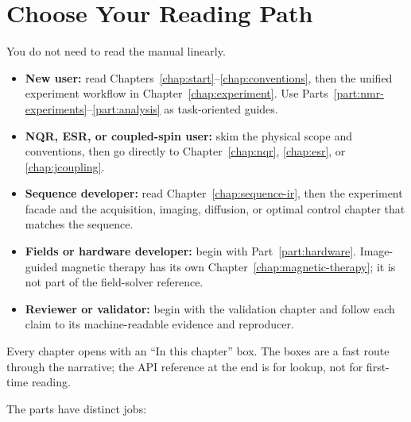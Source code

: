 \documentclass[11pt,oneside]{report}
\begin{document}
\section{Choose Your Reading Path}

You do not need to read the manual linearly.

\begin{itemize}
  \item \textbf{New user:} read Chapters~\ref{chap:start}--\ref{chap:conventions},
  then the unified experiment workflow in Chapter~\ref{chap:experiment}. Use
  Parts~\ref{part:nmr-experiments}--\ref{part:analysis} as task-oriented guides.
  \item \textbf{NQR, ESR, or coupled-spin user:} skim the physical scope and
  conventions, then go directly to Chapter~\ref{chap:nqr}, \ref{chap:esr}, or
  \ref{chap:jcoupling}.
  \item \textbf{Sequence developer:} read Chapter~\ref{chap:sequence-ir}, then
  the experiment facade and the acquisition, imaging, diffusion, or optimal
  control chapter that matches the sequence.
  \item \textbf{Fields or hardware developer:} begin with
  Part~\ref{part:hardware}. Image-guided magnetic therapy has its own
  Chapter~\ref{chap:magnetic-therapy}; it is not part of the field-solver
  reference.
  \item \textbf{Reviewer or validator:} begin with the validation chapter and
  follow each claim to its machine-readable evidence and reproducer.
\end{itemize}

Every chapter opens with an ``In this chapter'' box. The boxes are a fast route
through the narrative; the API reference at the end is for lookup, not for
first-time reading.

The parts have distinct jobs:
\end{document}
